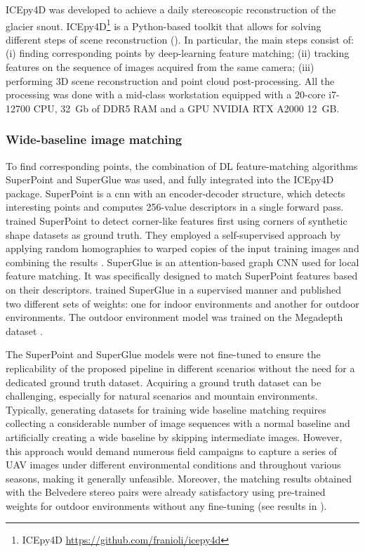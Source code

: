 ICEpy4D was developed to achieve a daily stereoscopic reconstruction of the glacier snout.
ICEpy4D\footnote{ICEpy4D \url{https://github.com/franioli/icepy4d}} is a Python-based toolkit that allows for solving different steps of scene reconstruction
(). 
In particular, the main steps consist of:
(i) finding corresponding points by deep-learning feature matching;
(ii) tracking features on the sequence of images acquired from the same camera;
(iii) performing 3D scene reconstruction and point cloud post-processing.
All the processing was done with a mid-class workstation equipped with a 20-core i7-12700 CPU, 32~Gb of DDR5 RAM and a GPU NVIDIA RTX A2000 12~GB.

\subsubsection{Wide-baseline image matching}\label{sec:4:matching}

To find corresponding points, the combination of DL feature-matching algorithms SuperPoint \citep{DeTone_2018} and SuperGlue \citep{sarlin2020superglue} was used, and
fully integrated into the ICEpy4D package.
SuperPoint is a \ac{cnn} with an encoder-decoder structure, which detects interesting points and computes 256-value descriptors in a single forward pass.
\citet{DeTone_2018} trained SuperPoint to detect corner-like features first using corners of synthetic shape datasets as ground truth.
They employed a self-supervised approach by applying random homographies to warped copies of the input training images and combining the results \citep{DeTone_2018}.
SuperGlue is an attention-based graph CNN used for local feature matching.
It was specifically designed to match SuperPoint features based on their descriptors.
\citet{sarlin2020superglue} trained SuperGlue in a supervised manner and published two different sets of weights: one for indoor environments and another for outdoor environments.
The outdoor environment model was trained on the Megadepth dataset \citep{Li_Snavely_2018_MegaDepth}.

The SuperPoint and SuperGlue models were not fine-tuned to ensure the replicability of the proposed pipeline in different scenarios without the need for a dedicated ground truth dataset.
Acquiring a ground truth dataset can be challenging, especially for natural scenarios and mountain environments.
Typically, generating datasets for training wide baseline matching requires collecting a considerable number of image sequences with a normal baseline and artificially creating a wide baseline by skipping intermediate images.
However, this approach would demand numerous field campaigns to capture a series of UAV images under different environmental conditions and throughout various seasons, making it generally unfeasible.
Moreover, the matching results obtained with the Belvedere stereo pairs were already satisfactory using pre-trained weights for outdoor environments without any fine-tuning (see results in ).

